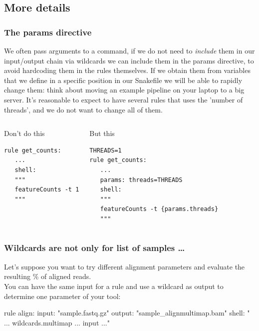 \documentclass[xcolor=table]{beamer}
\begin{document}
\subsection{More details}
\begin{frame}[fragile]
\frametitle{The params directive}
\begin{footnotesize}
We often pass arguments to a command, if we do not need to \emph{include} them in our input/output chain via wildcards we can include them in the params directive, to avoid
\textcolor{beer}{hardcoding} them in the rules themselves. If we obtain them from variables that we define in a specific position in our Snakefile we will be able to rapidly change them: think about
moving an example pipeline on your laptop to a big server. It's reasonable to expect to have several rules that uses the 'number of threads', and we do not want to change all of them.
\end{footnotesize}

\begin{columns}
\begin{beamerboxesrounded}[upper=upper_box,lower=lower_box,shadow=true]{Don't do this}
\begin{lstlisting}[basicstyle=\tiny]
rule get_counts:
   ...
   shell: 
   """
   featureCounts -t 1
   """
\end{lstlisting}
\end{beamerboxesrounded}

\begin{beamerboxesrounded}[upper=upper_box2,lower=lower_box,shadow=true]{But this}
\begin{lstlisting}[basicstyle=\tiny]
THREADS=1
rule get_counts:
   ...
   params: threads=THREADS
   shell: 
   """
   featureCounts -t {params.threads}
   """
\end{lstlisting}
\end{beamerboxesrounded}
\end{columns}
\end{frame}

\begin{frame}[fragile]
\frametitle{Wildcards are not only for list of samples \ldots}

Let's suppose you want to try different \textcolor{beer}{alignment parameters} and evaluate the resulting \% of aligned reads. \\
You can have the same input for a rule and use a wildcard as output to determine one parameter of your tool:
\begin{python}[basicstyle=\small]
rule align:
   input: "{sample}.fastq.gz"
   output: "{sample}_align{multimap}.bam"
   shell: " ... {wildcards.multimap} ...  {input} ..."
\end{python}

\end{frame}
\end{document}
